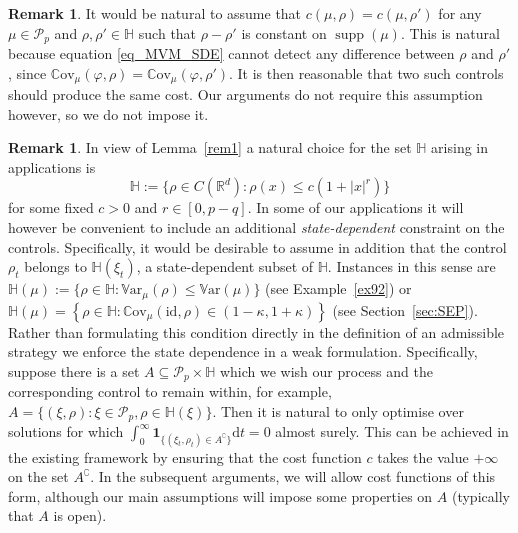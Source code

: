 \documentclass{article}
\theoremstyle{definition}
\newtheorem{remark}[theorem]{\textbf{Remark}}
\numberwithin{equation}{section}
\numberwithin{theorem}{section}
\newcommand{\R}{\mathbb{R}}
\newcommand{\dt}{\mathrm{d}t}
\newcommand{\Hb}{\mathbb{H}}
\DeclareMathOperator{\supp}{supp}
\newcommand{\Cov}{\mathbb{C}\mathrm{ov}}
\newcommand{\Var}{\mathbb{V}\mathrm{ar}}
\newcommand{\Pcal}{{\mathcal P}}
\begin{document}
\begin{remark}
It would be natural to assume that $c(\mu,\rho)=c(\mu,\rho')$ for any $\mu\in\Pcal_p$ and $\rho,\rho'\in\Hb$ such that $\rho-\rho'$ is constant on $\supp(\mu)$. This is natural because  equation \eqref{eq_MVM_SDE} cannot detect any difference between $\rho$ and $\rho'$, since $\Cov_\mu(\varphi,\rho)=\Cov_\mu(\varphi,\rho')$. It is then reasonable that two such controls should produce the same cost. Our arguments do not require this assumption however, so we do not impose it. %
\end{remark}

\begin{remark}\label{rem2}
In view of Lemma~\ref{rem1} a natural choice for the set $\Hb$ arising in applications is 
$$\Hb:=\{\rho\in C(\R^d)\colon \rho(x)\leq c(1+|x|^r)\}$$
for some fixed $c>0$ and $r\in[0,p-q]$. In some of our applications it will however be convenient to include an additional \emph{state-dependent} constraint on the controls. Specifically, it would be desirable to assume in addition that the control $\rho_t$ belongs to $\Hb(\xi_t)$, a state-dependent subset of $\Hb$. Instances in this sense are $\Hb(\mu):=\{\rho\in \Hb\colon \Var_\mu(\rho)\leq \Var(\mu)\}$ (see Example~\ref{ex92}) or $\Hb(\mu)=\left\{\rho\in\Hb:\Cov_{\mu}(\mathrm{id},\rho) \in (1-\kappa,1+\kappa) \right\}$ (see Section~\ref{sec:SEP}).
Rather than formulating this condition directly in the definition of an admissible strategy we enforce the state dependence in a weak formulation. Specifically, suppose there is a set $A \subseteq \Pcal_p \times \Hb$ which we wish our process and the corresponding control to remain within, for example, $A = \{(\xi,\rho)\colon \xi \in \Pcal_p, \rho \in \Hb(\xi)\}$. Then it is natural to only optimise over solutions for which $\int_0^\infty \bm1_{\{(\xi_t,\rho_t) \in A^{\complement} \}} \dt = 0$ almost surely. This can be achieved in the existing framework by ensuring that the cost function $c$ takes the value $+\infty$ on the set $A^{\complement}$. In the subsequent arguments, we will allow cost functions of this form, although our main assumptions will impose some properties on $A$ (typically that $A$ is open).
\end{remark}
\end{document}
